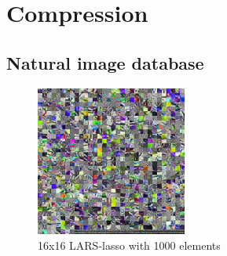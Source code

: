 \section{Compression}

\subsection{Natural image database}


\begin{figure}[H]
\centering
\includegraphics[width = 0.44\textwidth]{images/16_1000_1000_10_lasso.png}
\caption{16x16 LARS-lasso with 1000 elements}
\label{fig:16_1000_lasso}
\end{figure}

